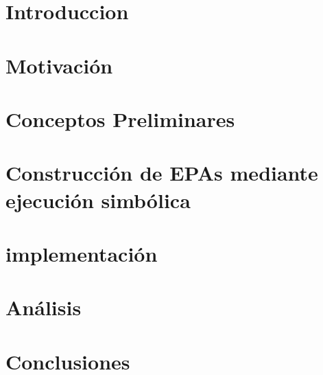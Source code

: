 \documentclass[11pt,a4paper,twoside]{tesis}
\theoremstyle{definition}
\begin{document}

\def\autor{Daniel Wappner}
\def\tituloTesis{Construcción de Enabledness Preserving Abstractions para smart contracts mediante ejecución simbólica}
\def\runtitulo{Construcción de Enabledness Preserving Abstractions para Smart Contracts mediante ejecución simbólica}
\def\runtitle{Construcción de Enabledness Preserving Abstractions para smart contracts mediante ejecución simbólica}
\def\codirector{Diego David Garbervetsky}
\def\director{Javier Godoy}
\def\lugar{Buenos Aires, 2024}


\frontmatter
\pagestyle{empty}





\cleardoublepage
\tableofcontents

\mainmatter
\pagestyle{headings}


\chapter{Introduccion}


\chapter{Motivación}

\chapter{Conceptos Preliminares}


\chapter{Construcción de EPAs mediante ejecución simbólica}


\chapter{implementación}

\chapter{Análisis}


\chapter{Conclusiones}

\backmatter
\printbibliography
\end{document}
